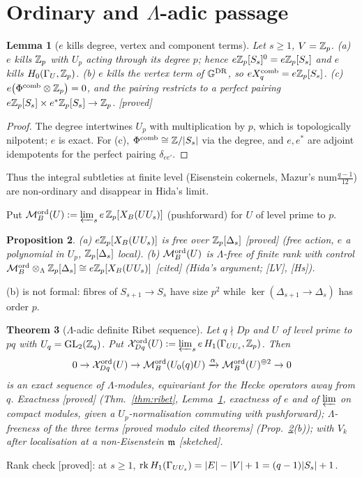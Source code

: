 \documentclass[11pt]{amsart}
\theoremstyle{plain}
\newtheorem{theorem}{Theorem}[section]
\newtheorem{proposition}[theorem]{Proposition}
\newtheorem{lemma}[theorem]{Lemma}
\theoremstyle{definition}
\theoremstyle{remark}
\newcommand{\status}[1]{\textup{\textsf{[#1]}}}
\newcommand{\stproved}{\status{proved}}
\newcommand{\stpmc}{\status{proved modulo cited theorems}}
\newcommand{\stcited}{\status{cited}}
\newcommand{\stsketch}{\status{sketched}}
\newcommand{\GL}{\mathrm{GL}}\newcommand{\SL}{\mathrm{SL}}\newcommand{\PGL}{\mathrm{PGL}}
\newcommand{\cM}{\mathcal{M}}\newcommand{\Frac}{\mathrm{Frac}}\newcommand{\tq}{\mathfrak{t}}\newcommand{\cc}{\mathfrak{c}}
\newcommand{\G}{\mathbb{G}}\newcommand{\Iw}{\mathrm{Iw}}\newcommand{\Hb}{\mathfrak{H}}
\begin{document}
\section{Ordinary and $\Lambda$-adic passage}\label{sec:lambda}

\begin{lemma}[$e$ kills degree, vertex and component terms]\label{lem:ekills}
Let $s\ge1$, $V=\mathbb{Z}_p$. (a) $e$ kills $\mathbb{Z}_p$ with $U_p$ acting through its degree $p$; hence $e\mathbb{Z}_p[S_s]^0=e\mathbb{Z}_p[S_s]$ and $e$ kills $H_0(\Gamma_U,\mathbb{Z}_p)$. (b) $e$ kills the vertex term of $\G^{\rm DR}$, so $eX^{\rm comb}_q=e\mathbb{Z}_p[S_s]$. (c) $e\big(\Phi^{\rm comb}\otimes\mathbb{Z}_p\big)=0$, and the pairing restricts to a perfect pairing $e\mathbb{Z}_p[S_s]\times e^*\mathbb{Z}_p[S_s]\to\mathbb{Z}_p$. \stproved
\end{lemma}
\begin{proof}
The degree intertwines $U_p$ with multiplication by $p$, which is topologically nilpotent; $e$ is exact. For (c), $\Phi^{\rm comb}\cong\mathbb{Z}/|S_s|$ via the degree, and $e,e^*$ are adjoint idempotents for the perfect pairing $\delta_{ee'}$.
\end{proof}
Thus the integral subtleties at finite level (Eisenstein cokernels, Mazur's $\mathrm{num}\frac{q-1}{12}$) are non-ordinary and disappear in Hida's limit.

Put $\cM^{\rm ord}_B(U):=\varprojlim_se\,\Z_p[X_B(UU_s)]$ (pushforward) for $U$ of level prime to $p$.
\begin{proposition}\label{prop:free}
(a) $e\mathbb{Z}_p[X_B(UU_s)]$ is free over $\mathbb{Z}_p[\Delta_s]$ \stproved{} (free action, $e$ a polynomial in $U_p$, $\mathbb{Z}_p[\Delta_s]$ local).
(b) $\cM^{\rm ord}_B(U)$ is $\Lambda$-free of finite rank with control $\cM^{\rm ord}_B\otimes_\Lambda\Z_p[\Delta_s]\cong e\Z_p[X_B(UU_s)]$ \stcited{} (Hida's argument; [LV], [Hs]).
\end{proposition}
(b) is not formal: fibres of $S_{s+1}\to S_s$ have size $p^2$ while $\ker(\Delta_{s+1}\to\Delta_s)$ has order $p$.

\begin{theorem}[$\Lambda$-adic definite Ribet sequence]\label{thm:lambdaribet}
Let $q\nmid Dp$ and $U$ of level prime to $pq$ with $U_q=\GL_2(\Z_q)$. Put $\mathcal{X}^{\rm ord}_{Dq}(U):=\varprojlim_se\,H_1(\Gamma_{UU_s},\mathbb{Z}_p)$. Then
\[0\to\cX^{\rm ord}_{Dq}(U)\to\cM^{\rm ord}_B(U_0(q)U)\xrightarrow{\alpha}\cM^{\rm ord}_B(U)^{\oplus2}\to0\]
is an exact sequence of $\Lambda$-modules, equivariant for the Hecke operators away from $q$. Exactness \stproved{} (Thm.~\ref{thm:ribet}, Lemma~\ref{lem:ekills}, exactness of $e$ and of $\varprojlim$ on compact modules, given a $U_p$-normalisation commuting with pushforward); $\Lambda$-freeness of the three terms \stpmc{} (Prop.~\ref{prop:free}(b)); with $V_k$ after localisation at a non-Eisenstein $\mathfrak{m}$ \stsketch.
\end{theorem}
\noindent Rank check \stproved: at $s\ge1$, $\operatorname{rk} H_1(\Gamma_{UU_s})=|E|-|V|+1=(q-1)|S_s|+1$.
\end{document}
